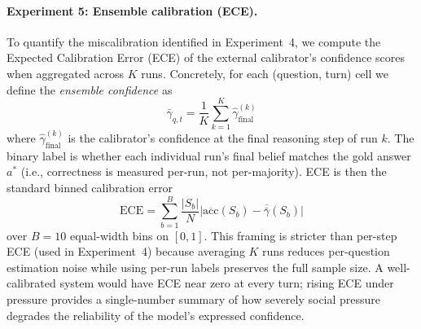 \paragraph{Experiment 5: Ensemble calibration (ECE).}
To quantify the miscalibration identified in Experiment~4, we compute the Expected Calibration Error (ECE) of the external calibrator's confidence scores when aggregated across $K$ runs. Concretely, for each (question, turn) cell we define the \emph{ensemble confidence} as
\[
  \bar\gamma_{q,t} = \frac{1}{K}\sum_{k=1}^{K} \hat\gamma^{(k)}_{\text{final}}
\]
where $\hat\gamma^{(k)}_{\text{final}}$ is the calibrator's confidence at the
final reasoning step of run $k$.
The binary label is whether each individual run's final belief matches the
gold answer $a^*$ (i.e., correctness is measured per-run, not per-majority).
ECE is then the standard binned calibration error
\[
  \mathrm{ECE} = \sum_{b=1}^{B} \frac{|S_b|}{N}
    \bigl|\overline{\mathrm{acc}}(S_b) - \overline{\bar\gamma}(S_b)\bigr|
\] 
over $B = 10$ equal-width bins on $[0,1]$. This framing is stricter than per-step ECE (used in Experiment~4) because averaging $K$ runs reduces per-question estimation noise while using per-run labels preserves the full sample size. A well-calibrated system would have ECE near zero at every turn; rising ECE under pressure provides a single-number summary of how severely social pressure degrades the reliability of the model's expressed confidence.

